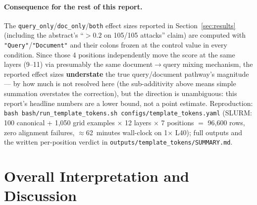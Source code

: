 \documentclass[11pt]{article}
\begin{document}
\paragraph{Consequence for the rest of this report.} The
\texttt{query\_only}/\texttt{doc\_only}/\texttt{both} effect sizes reported
in Section~\ref{sec:results} (including the abstract's ``$>0.2$ on 105/105
attacks'' claim) are computed with \texttt{"Query"}/\texttt{"Document"} and
their colons frozen at the control value in every condition. Since those
4 positions independently move the score at the same layers (9--11) via
presumably the same document$\to$query mixing mechanism, the reported
effect sizes \textbf{understate} the true query/document pathway's
magnitude — by how much is not resolved here (the sub-additivity above
means simple summation overstates the correction), but the direction is
unambiguous: this report's headline numbers are a lower bound, not a point
estimate. Reproduction: \texttt{bash bash/run\_template\_tokens.sh
configs/template\_tokens.yaml} (SLURM: 100 canonical + 1{,}050 grid
examples $\times$ 12 layers $\times$ 7 positions $=$ 96{,}600 rows, zero
alignment failures, $\approx$62~minutes wall-clock on 1$\times$ L40); full
outputs and the written per-position verdict in
\texttt{outputs/template\_tokens/SUMMARY.md}.

\section{Overall Interpretation and Discussion}
\end{document}
